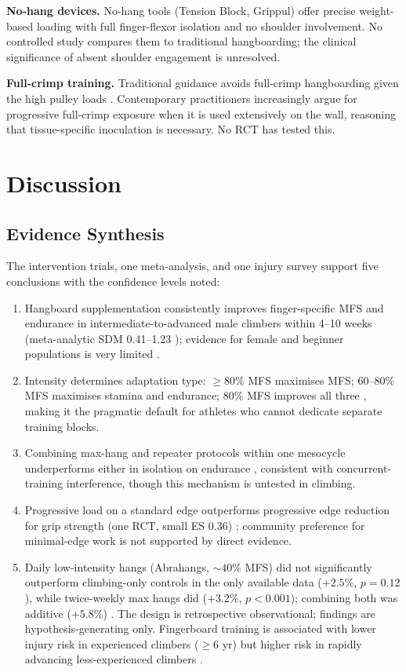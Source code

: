 \documentclass[12pt,a4paper]{article}
\begin{document}
\textbf{No-hang devices.} No-hang tools (Tension Block, Grippul) offer precise weight-based loading with full finger-flexor isolation and no shoulder involvement. No controlled study compares them to traditional hangboarding; the clinical significance of absent shoulder engagement is unresolved.

\textbf{Full-crimp training.} Traditional guidance avoids full-crimp hangboarding given the high pulley loads \cite{schweizer2001}. Contemporary practitioners increasingly argue for progressive full-crimp exposure when it is used extensively on the wall, reasoning that tissue-specific inoculation is necessary. No RCT has tested this.

\section{Discussion}

\subsection{Evidence Synthesis}

The intervention trials, one meta-analysis, and one injury survey support five conclusions with the confidence levels noted:
\begin{enumerate}[noitemsep, topsep=2pt]
  \item Hangboard supplementation consistently improves finger-specific MFS and endurance in intermediate-to-advanced male climbers within 4--10 weeks (meta-analytic SDM 0.41--1.23 \cite{stien2023}); evidence for female and beginner populations is very limited \cite{langer2024}.
  \item Intensity determines adaptation type: $\geq80\%$ MFS maximises MFS; 60--80\% MFS maximises stamina and endurance; 80\% MFS improves all three \cite{devise2022}, making it the pragmatic default for athletes who cannot dedicate separate training blocks.
  \item Combining max-hang and repeater protocols within one mesocycle underperforms either in isolation on endurance \cite{lopezrivera2019}, consistent with concurrent-training interference, though this mechanism is untested in climbing.
  \item Progressive load on a standard edge outperforms progressive edge reduction for grip strength (one RCT, small ES 0.36) \cite{mundry2021}; community preference for minimal-edge work is not supported by direct evidence.
  \item Daily low-intensity hangs (Abrahangs, ${\sim}40\%$ MFS) did not significantly outperform climbing-only controls in the only available data ($+2.5\%$, $p = 0.12$), while twice-weekly max hangs did ($+3.2\%$, $p < 0.001$); combining both was additive ($+5.8\%$) \cite{gilmore2024}. The design is retrospective observational; findings are hypothesis-generating only. Fingerboard training is associated with lower injury risk in experienced climbers ($\geq6$ yr) but higher risk in rapidly advancing less-experienced climbers \cite{sjoman2023}.
\end{enumerate}
\end{document}
